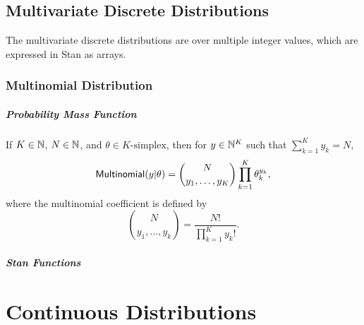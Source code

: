 \chapter{Multivariate Discrete Distributions}

\noindent
The multivariate discrete distributions are over multiple integer
values, which are expressed in Stan as arrays.

\section{Multinomial Distribution}

\subsubsection{Probability Mass Function}

If $K \in \mathbb{N}$, $N \in \mathbb{N}$, and $\theta \in \mbox{$K$-simplex}$,
then for $y \in \mathbb{N}^K$ such that $\sum_{k=1}^K y_k = N$,
%
\[
\mbox{\sf Multinomial}(y|\theta)
= \binom{N}{y_1,\ldots,y_K}
\prod_{k=1}^K \theta_k^{y_k},
\]
where the multinomial coefficient is defined by
\[
\binom{N}{y_1,\ldots,y_k}
= \frac{N!}{\prod_{k=1}^K y_k!}.
\]


\subsubsection{Stan Functions}

\begin{description}
%
\end{description}



\part{Continuous Distributions}\label{continuous-prob-functions.part}



